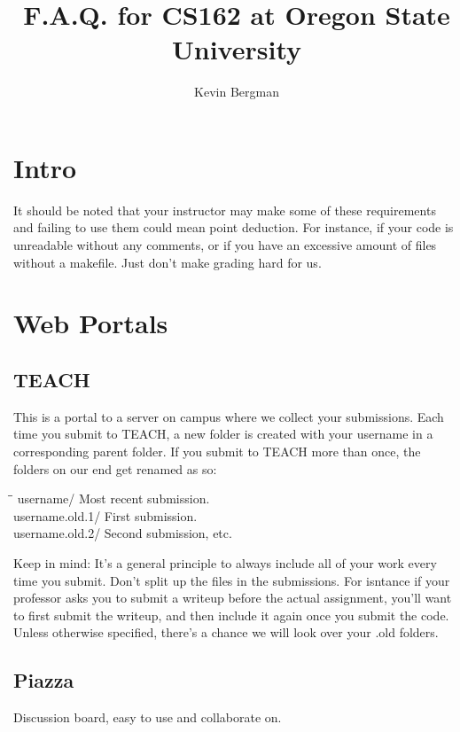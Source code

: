 \documentclass[letterpaper,10pt,titlepage,fleqn]{article}
\title{F.A.Q. for CS162 at Oregon State University}
\author{Kevin Bergman}
\begin{document}
\maketitle

\tableofcontents

\newpage

\section{Intro}
It should be noted that your instructor may make some of these requirements and failing to use them could mean point deduction. For instance, if your code is unreadable without any comments, or if you have an excessive amount of files without a makefile. Just don’t make grading hard for us.


\section{Web Portals}


\subsection{TEACH}
This is a portal to a server on campus where we collect your submissions. Each time you submit to TEACH, a new folder is created with your username in a corresponding parent folder. If you submit to TEACH more than once, the folders on our end get renamed as so:

\begin{tabbing}
\hspace*{2cm}\=\hspace*{3cm}\= \kill
username/ 		\>\> Most recent submission. \\
username.old.1/ \>\> First submission. \\
username.old.2/ \>\> Second submission, etc. \\
\end{tabbing}

Keep in mind: It’s a general principle to always include all of your work every
time you submit. Don’t split up the files in the submissions. For isntance if
your professor asks you to submit a writeup before the actual assignment, you'll
want to first submit the writeup, and then include it again once you submit the
code. Unless otherwise specified, there’s a chance we will look over your .old folders.

\subsection{Piazza}
Discussion board, easy to use and collaborate on.
\end{document}
